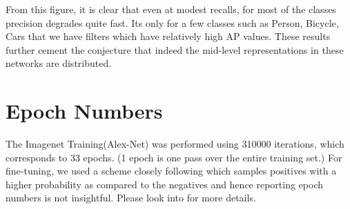 \documentclass[runningheads]{llncs}
\begin{document}
From this figure, it is clear that even at modest recalls, for most of the classes precision degrades quite fast. Its only for a few classes such as Person, Bicycle, Cars that we have filters which have relatively high AP values. These results further cement the conjecture that indeed the mid-level representations in these networks are distributed.

\section{Epoch Numbers}
The Imagenet Training(Alex-Net) was performed using 310000 iterations, which corresponds to 33 epochs. (1 epoch is one pass over the entire training set.) For fine-tuning, we used a scheme closely following \cite{Rcnn} which samples positives with a higher probability as compared to the negatives and hence reporting epoch numbers is not insightful. Please look into \cite{Rcnn} for more details.



\end{document}
